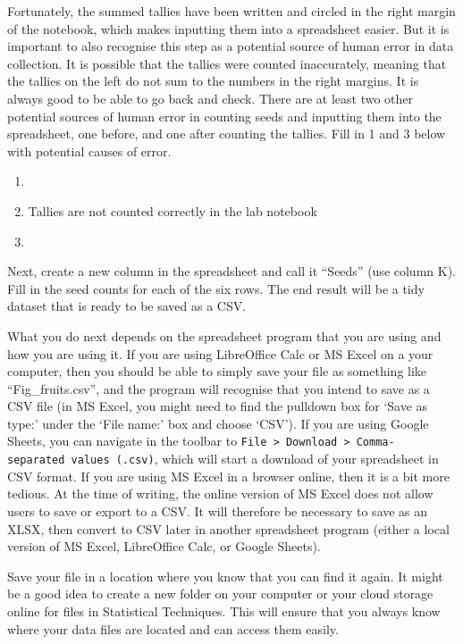 \documentclass[
]{scrbook}
\providecommand{\tightlist}{%
  \setlength{\itemsep}{0pt}\setlength{\parskip}{0pt}}
\begin{document}
Fortunately, the summed tallies have been written and circled in the right margin of the notebook, which makes inputting them into a spreadsheet easier.
But it is important to also recognise this step as a potential source of human error in data collection.
It is possible that the tallies were counted inaccurately, meaning that the tallies on the left do not sum to the numbers in the right margins.
It is always good to be able to go back and check.
There are at least two other potential sources of human error in counting seeds and inputting them into the spreadsheet, one before, and one after counting the tallies.
Fill in 1 and 3 below with potential causes of error.

\begin{enumerate}
\def\labelenumi{\arabic{enumi}.}
\tightlist
\item
\item
  Tallies are not counted correctly in the lab notebook
\item
\end{enumerate}

Next, create a new column in the spreadsheet and call it ``Seeds'' (use column K).
Fill in the seed counts for each of the six rows.
The end result will be a tidy dataset that is ready to be saved as a CSV.

What you do next depends on the spreadsheet program that you are using and how you are using it.
If you are using LibreOffice Calc or MS Excel on a your computer, then you should be able to simply save your file as something like ``Fig\_fruits.csv'', and the program will recognise that you intend to save as a CSV file (in MS Excel, you might need to find the pulldown box for `Save as type:' under the `File name:' box and choose `CSV').
If you are using Google Sheets, you can navigate in the toolbar to \texttt{File\ \textgreater{}\ Download\ \textgreater{}\ Comma-separated\ values\ (.csv)}, which will start a download of your spreadsheet in CSV format.
If you are using MS Excel in a browser online, then it is a bit more tedious.
At the time of writing, the online version of MS Excel does not allow users to save or export to a CSV.
It will therefore be necessary to save as an XLSX, then convert to CSV later in another spreadsheet program (either a local version of MS Excel, LibreOffice Calc, or Google Sheets).

Save your file in a location where you know that you can find it again.
It might be a good idea to create a new folder on your computer or your cloud storage online for files in Statistical Techniques.
This will ensure that you always know where your data files are located and can access them easily.
\end{document}

